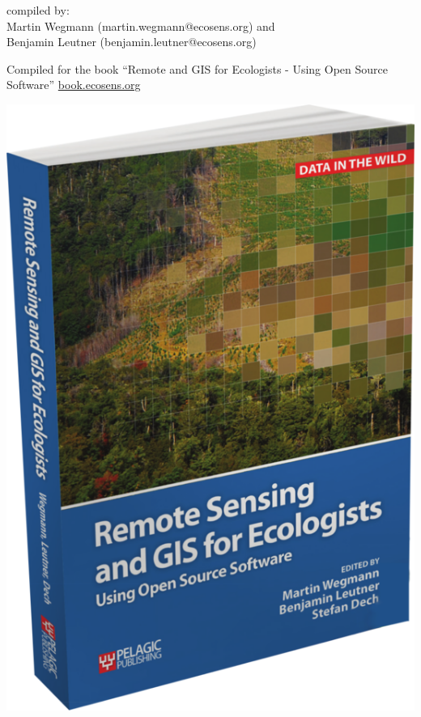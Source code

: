 \documentclass[10pt,landscape]{article}
\begin{document}
\begin{multicols}{3}
\vspace{.2cm}

compiled by: \vspace{.2cm}\\Martin Wegmann (martin.wegmann@ecosens.org) and \\Benjamin Leutner (benjamin.leutner@ecosens.org) \\ \THEYEAR	

\vspace{.2cm}

Compiled for the book ``Remote and GIS for Ecologists - Using Open Source Software'' \url{book.ecosens.org}


\bigskip

\bigskip



\begin{center}
 \includegraphics[width=.2\textwidth]{pics/RS_GIS_Ecology_book_wegmann_leutner_dech_book_ecosens_org_BookCover.png}
\end{center}



\end{multicols}
\end{document}
